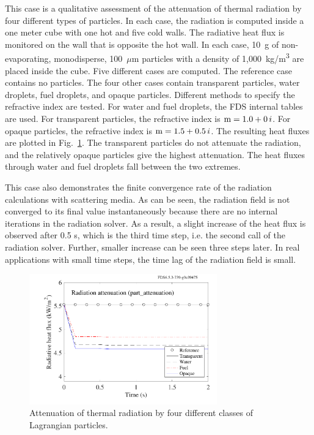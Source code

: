 \documentclass[11pt]{book}
\begin{document}
This case is a qualitative assessment of the attenuation of thermal radiation by four different types of particles. In each case, the radiation is computed inside a one meter cube with one hot and five cold walls. The radiative heat flux is monitored on the wall that is opposite the hot wall. In each case, 10~g of non-evaporating, monodisperse, 100~$\mu$m particles with a density of 1,000~\si{kg/m^3} are placed inside the cube. Five different cases are computed. The reference case contains no particles. The four other cases contain transparent particles, water droplets, fuel droplets, and opaque particles. Different methods to specify the refractive index are tested. For water and fuel droplets, the FDS internal tables are used. For transparent particles, the refractive index is $\hbox{m} = 1.0+0\,i$. For opaque particles, the refractive index is $\hbox{m} = 1.5+0.5 \,i$. The resulting heat fluxes are plotted in Fig.~\ref{part_attenuation_figure}. The transparent particles do not attenuate the radiation, and the relatively opaque particles give the highest attenuation. The heat fluxes through water and fuel droplets fall between the two extremes.

This case also demonstrates the finite convergence rate of the radiation calculations with scattering media. As can be seen, the radiation field is not converged to its final value instantaneously because there are no internal iterations in the radiation solver. As a result, a slight increase of the heat flux is observed after 0.5 s, which is the third time step, i.e. the second call of the radiation solver. Further, smaller increase can be seen three steps later. In real applications with small time steps, the time lag of the radiation field is small.

\begin{figure}[h]
\centering
\includegraphics[width=3.2in]{SCRIPT_FIGURES/part_attenuation}
\caption[Radiation attenuation by Lagrangian particles]{Attenuation of thermal radiation by four different classes of Lagrangian particles.}
\label{part_attenuation_figure}
\end{figure}
\end{document}
